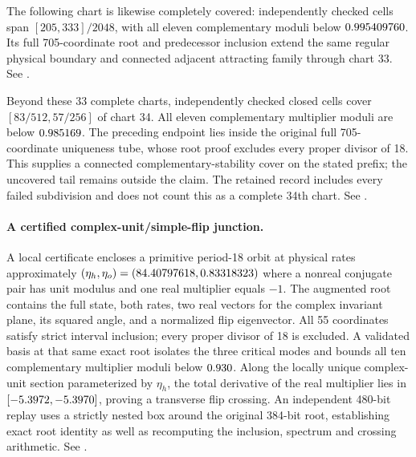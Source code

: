 \documentclass[11pt,letterpaper]{article}
\begin{document}
The following chart is likewise completely covered: \nChartThirtyThreeCells{}
independently checked cells span $[205,333]/2048$, with all eleven complementary
moduli below $0.995409760$. Its full 705-coordinate root and
predecessor inclusion extend the same regular physical boundary and connected
adjacent attracting family through chart 33. See
.

Beyond these 33 complete charts, \nChartThirtyFourPrefixCells{} independently
checked closed cells cover $[83/512,57/256]$ of chart 34. All eleven
complementary multiplier moduli are below $0.985169$.
The preceding endpoint lies inside the original full 705-coordinate
uniqueness tube, whose root proof excludes every proper divisor of 18.
This supplies a connected complementary-stability cover on the stated prefix;
the uncovered tail remains outside the claim. The retained record includes
every failed subdivision and does not count this as a complete 34th chart.
See .

\paragraph{A certified complex-unit/simple-flip junction.}
A local certificate encloses a primitive period-18 orbit at physical rates approximately
$(\eta_h,\eta_o)=(84.40797618,0.83318323)$ where a nonreal conjugate pair has unit modulus
and one real multiplier equals $-1$. The augmented root contains the full state, both rates, two
real vectors for the complex invariant plane, its squared angle, and a normalized flip eigenvector.
All 55 coordinates satisfy strict interval inclusion; every proper divisor of 18 is excluded.
A validated basis at that same exact root isolates the three critical modes and bounds all ten
complementary multiplier moduli below $0.930$. Along the locally unique complex-unit
section parameterized by $\eta_h$, the total derivative of the real multiplier lies in
$[-5.3972, -5.3970]$, proving a transverse flip crossing. An independent 480-bit replay uses a
strictly nested box around the original 384-bit root, establishing exact root identity as well as
recomputing the inclusion, spectrum and crossing arithmetic. See
.
\end{document}
